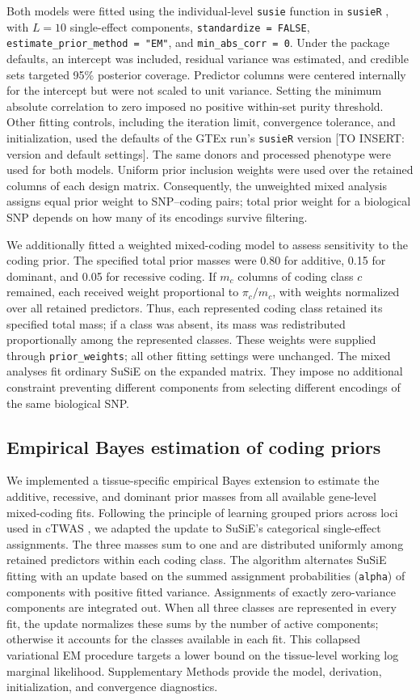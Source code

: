 \documentclass[12pt]{article}
\begin{document}
Both models were fitted using the individual-level \texttt{susie} function
in \texttt{susieR} \cite{wang_simple_2020}, with $L=10$ single-effect
components, \texttt{standardize = FALSE},
\texttt{estimate\_prior\_method = "EM"}, and
\texttt{min\_abs\_corr = 0}. Under the package defaults, an intercept was
included, residual variance was estimated, and credible sets targeted
95\% posterior coverage. Predictor columns were centered internally for
the intercept but were not scaled to unit variance. Setting the minimum
absolute correlation to zero imposed no positive within-set purity
threshold. Other fitting controls, including the iteration limit,
convergence tolerance, and initialization, used the defaults of the GTEx
run's \texttt{susieR} version [TO INSERT: version and default settings].
The same donors and processed phenotype were used for both models.
Uniform prior inclusion weights were used over the retained columns of
each design matrix. Consequently, the unweighted mixed analysis assigns
equal prior weight to SNP--coding pairs; total prior weight for a
biological SNP depends on how many of its encodings survive filtering.

We additionally fitted a weighted mixed-coding model to assess sensitivity
to the coding prior. The specified total prior masses were 0.80 for
additive, 0.15 for dominant, and 0.05 for recessive coding. If $m_c$ columns
of coding class $c$ remained, each received weight proportional to
$\pi_c/m_c$, with weights normalized over all retained predictors.
Thus, each represented coding class retained its specified total mass;
if a class was absent, its mass was redistributed proportionally among
the represented classes. These weights were supplied through
\texttt{prior\_weights}; all other fitting settings were unchanged.
The mixed analyses fit ordinary SuSiE on the expanded matrix. They impose
no additional constraint preventing different components from selecting
different encodings of the same biological SNP.

\subsection{Empirical Bayes estimation of coding priors}
We implemented a tissue-specific empirical Bayes extension to estimate
the additive, recessive, and dominant prior masses from all available
gene-level mixed-coding fits. Following the principle of learning grouped
priors across loci used in cTWAS \cite{zhao_adjusting_2024}, we adapted the
update to SuSiE's categorical single-effect assignments. The three masses
sum to one and are distributed uniformly among retained predictors within
each coding class. The algorithm alternates SuSiE fitting with an update
based on the summed assignment probabilities (\texttt{alpha}) of components
with positive fitted variance. Assignments of exactly zero-variance
components are integrated out. When all three classes are represented in
every fit, the update normalizes these sums by the number of active
components; otherwise it accounts for the classes available in each fit.
This collapsed variational EM procedure targets
a lower bound on the tissue-level working log marginal likelihood.
Supplementary Methods provide the model, derivation, initialization, and
convergence diagnostics.
\end{document}
